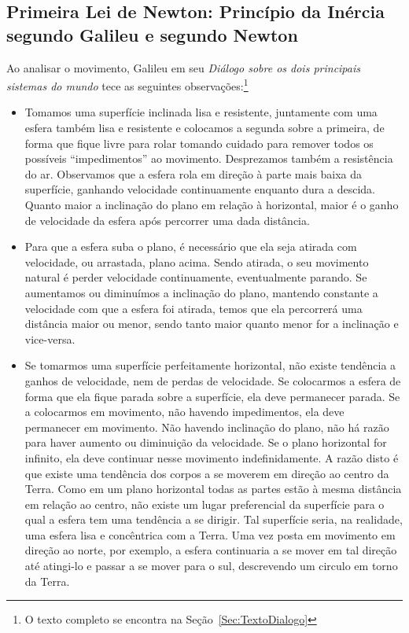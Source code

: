 \subsection{Primeira Lei de Newton: Princípio da Inércia segundo Galileu e segundo Newton}

Ao analisar o movimento, Galileu em seu \emph{Diálogo sobre os dois principais sistemas do mundo} tece as seguintes observações:\footnote{O texto completo se encontra na Seção~\ref{Sec:TextoDialogo}}
\begin{itemize}
  \item Tomamos uma superfície inclinada lisa e resistente, juntamente com uma esfera também lisa e resistente e colocamos a segunda sobre a primeira, de forma que fique livre para rolar tomando cuidado para remover todos os possíveis ``impedimentos'' ao movimento. Desprezamos também a resistência do ar. Observamos que a esfera rola em direção à parte mais baixa da superfície, ganhando velocidade continuamente enquanto dura a descida. Quanto maior a inclinação do plano em relação à horizontal, maior é o ganho de velocidade da esfera após percorrer uma dada distância.
  \item Para que a esfera suba o plano, é necessário que ela seja atirada com velocidade, ou arrastada, plano acima. Sendo atirada, o seu movimento natural é perder velocidade continuamente, eventualmente parando. Se aumentamos ou diminuímos a inclinação do plano, mantendo constante a velocidade com que a esfera foi atirada, temos que ela percorrerá uma distância maior ou menor, sendo tanto maior quanto menor for a inclinação e vice-versa.
  \item Se tomarmos uma superfície perfeitamente horizontal, não existe tendência a ganhos de velocidade, nem de perdas de velocidade. Se colocarmos a esfera de forma que ela fique parada sobre a superfície, ela deve permanecer parada. Se a colocarmos em movimento, não havendo impedimentos, ela deve permanecer em movimento. Não havendo inclinação do plano, não há razão para haver aumento ou diminuição da velocidade. Se o plano horizontal for infinito, ela deve continuar nesse movimento indefinidamente. A razão disto é que existe uma tendência dos corpos a se moverem em direção ao centro da Terra. Como em um plano horizontal todas as partes estão à mesma distância em relação ao centro, não existe um lugar preferencial da superfície para o qual a esfera tem uma tendência a se dirigir. Tal superfície seria, na realidade, uma esfera lisa e concêntrica com a Terra. Uma vez posta em movimento em direção ao norte, por exemplo, a esfera continuaria a se mover em tal direção até atingi-lo e passar a se mover para o sul, descrevendo um circulo em torno da Terra.
\end{itemize}
